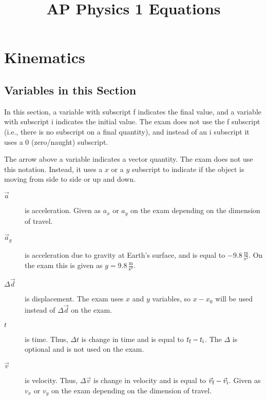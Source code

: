 \documentclass{article}[11pt]
\title{AP Physics 1 Equations}
\author{}
\date{}
\numberwithin{equation}{section}
\begin{document}
    \maketitle
    \tableofcontents

    \newpage
    \section{Kinematics}
        \subsection*{Variables in this Section}
            In this section, a variable with subscript f indicates the final
            value, and a variable with subscript i indicates the initial
            value. The exam does not use the f subscript (i.e., there is no
            subscript on a final quantity), and instead of an i subscript it
            uses a $0$ (zero/naught) subscript.

            The arrow above a variable indicates a vector quantity. The exam
            does not use this notation. Instead, it uses a $x$ or a $y$
            subscript to indicate if the object is moving from side to side or
            up and down.

            \begin{description}
                \item[$\vec{a}$] is acceleration. Given as $a_x$ or $a_y$ on
                the exam depending on the dimension of travel.
                \item[$\vec{a}_g$] is acceleration due to gravity at Earth's
                surface, and is equal to $-9.8\, \frac{\text{m}}{\text{s}^2}$.
                On the exam this is given as
                $g = 9.8\, \frac{\text{m}}{\text{s}^2}$.
                \item[$\Delta \vec{d}$] is displacement. The exam uses $x$ and
                $y$ variables, so $x - x_0$ will be used instead of $\Delta
                \vec{d}$ on the exam.
                \item[$t$] is time. Thus, $\Delta t$ is change in time and is
                equal to $t_\textup{f} - t_\textup{i}$. The $\Delta$ is
                optional and is not used on the exam.
                \item[$\vec{v}$] is velocity. Thus, $\Delta \vec{v}$ is change
                in velocity and is equal to
                $\vec{v}_\textup{f} - \vec{v}_\textup{i}$. Given as $v_x$ or
                $v_y$ on the exam depending on the dimension of travel.
            \end{description}
\end{document}
